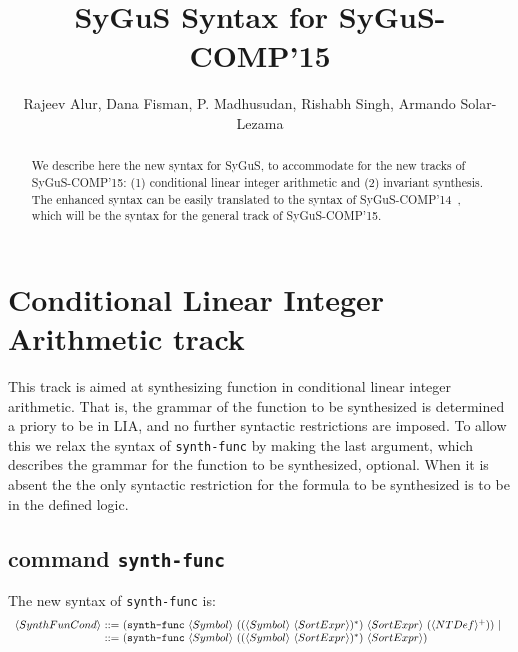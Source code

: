 \documentclass{llncs}
\title{SyGuS Syntax for SyGuS-COMP'15}
\author{Rajeev Alur, Dana Fisman, P. Madhusudan, Rishabh Singh, Armando Solar-Lezama}
\institute{}
\begin{document}
\maketitle

\newcommand{\la}{\langle}
\newcommand{\ra}{\rangle}
\newcommand{\commentout}[1]{}

\begin{abstract}
We describe here the new syntax for SyGuS, to accommodate for the new tracks of SyGuS-COMP'15: (1) conditional linear integer arithmetic and (2) invariant synthesis. The enhanced syntax can be easily translated to the syntax of SyGuS-COMP'14~\cite{sygus-if}, which will be the syntax for the general track of  SyGuS-COMP'15.
\end{abstract}

\section{Conditional Linear Integer Arithmetic track}
This track is aimed at synthesizing function in conditional linear integer arithmetic. That is, the grammar of the function to be synthesized is determined a priory to be in LIA, and no further syntactic restrictions are imposed. To allow this we relax the syntax of \texttt{synth-func} by making the last argument, which describes the grammar for the function to be synthesized, optional. When it is absent the the only syntactic restriction for the formula to be synthesized is to be in the defined logic. 

\commentout{
\subsection*{Current Syntax of \texttt{synth-func}}
The current syntax of the \texttt{synth-func} is:
$$\begin{array}{r@{~::=~}l}
\la SynthFunCond\ra & (\texttt{synth-func} ~\la Symbol \ra ~(( \la Symbol \ra  ~\la SortExpr\ra)^*) ~\la SortExpr \ra ~(
\la NTDef\ra^+)) 
\end{array}$$
where the last argument
$(\la NTDef\ra^+)$ provides the definition of the grammar by specifying the expansion of the non-terminals.
$$\begin{array}{r@{~::=~}l}
\la NTDef\ra & (\la Symbol \ra ~\la SortExpr \ra ~\la GTerm \ra^+)
\end{array}$$}

\subsection*{command \texttt{synth-func}}
The new syntax of \texttt{synth-func} is: 
$$\begin{array}{r@{~::=~}l}
\la SynthFunCond\ra & (\texttt{synth-func} ~\la Symbol \ra ~(( \la Symbol \ra  ~\la SortExpr\ra)^*) ~\la SortExpr \ra ~(
\la NTDef\ra^+)) ~|~ \\
 & (\texttt{synth-func} ~\la Symbol \ra ~(( \la Symbol \ra  ~\la SortExpr\ra)^*) ~\la SortExpr \ra )
\end{array}$$
\end{document}
